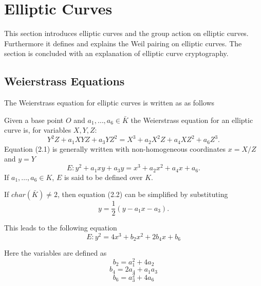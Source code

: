 \section{Elliptic Curves}
This section introduces elliptic curves and the group action on elliptic curves. Furthermore it defines and explains the Weil pairing on elliptic curves. The section is concluded with an explanation of elliptic curve cryptography.
\subsection{Weierstrass Equations}
The Weierstrass equation for elliptic curves is written as as follows
\begin{defn}
	Given a base point $O$ and $a_1,\dots,a_6\in\bar{K}$ the Weierstrass equation for an elliptic curve is, for variables $X,Y,Z$:
	\begin{equation}
	Y^2Z+a_1XYZ+a_3YZ^2=X^3+a_2X^2Z+a_4XZ^2+a_6Z^3.
	\end{equation}
	Equation (2.1) is generally written with non-homogeneous coordinates $x=X/Z$ and $y=Y$
	\begin{equation}
	E:y^2+a_1xy+a_3y=x^3+a_2x^2+a_4x+a_6.
	\end{equation}
	If $a_1,\dots,a_6\in K$, $E$ is said to be defined over $K$.
\end{defn}

If $char(\bar{K})\neq 2$, then equation (2.2) can be simplified by substituting
\begin{equation}
y=\frac{1}{2}(y-a_1x-a_3).
\end{equation}

This leads to the following equation
\begin{equation}
E:y^2=4x^3+b_2x^2+2b_4x+b_6
\end{equation}

Here the variables are defined as
\begin{equation}
{b_2=a_1^2+4a_2}
\end{equation}
\begin{equation}
{b_4=2a_4+a_1a_3}
\end{equation}
\begin{equation}
{b_6=a_3^2+4a_6}
\end{equation}

